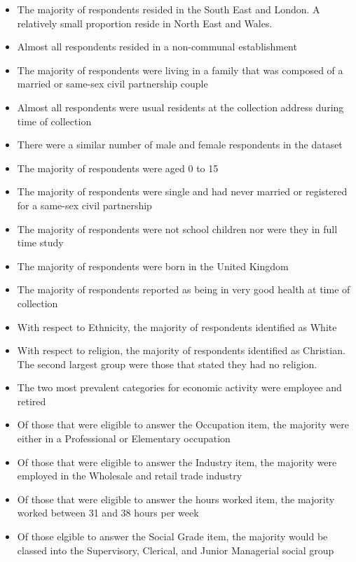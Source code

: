 \documentclass[]{book}
\providecommand{\tightlist}{%
  \setlength{\itemsep}{0pt}\setlength{\parskip}{0pt}}
\begin{document}
\begin{itemize}
\tightlist
\item
  The majority of respondents resided in the South East and London. A
  relatively small proportion reside in North East and Wales.\\
\item
  Almost all respondents resided in a non-communal establishment\\
\item
  The majority of respondents were living in a family that was composed
  of a married or same-sex civil partnership couple\\
\item
  Almost all respondents were usual residents at the collection address
  during time of collection\\
\item
  There were a similar number of male and female respondents in the
  dataset\\
\item
  The majority of respondents were aged 0 to 15\\
\item
  The majority of respondents were single and had never married or
  registered for a same-sex civil partnership
\item
  The majority of respondents were not school children nor were they in
  full time study
\item
  The majority of respondents were born in the United Kingdom\\
\item
  The majority of respondents reported as being in very good health at
  time of collection
\item
  With respect to Ethnicity, the majority of respondents identified as
  White\\
\item
  With respect to religion, the majority of respondents identified as
  Christian. The second largest group were those that stated they had no
  religion.\\
\item
  The two most prevalent categories for economic activity were employee
  and retired\\
\item
  Of those that were eligible to answer the Occupation item, the
  majority were either in a Professional or Elementary occupation
\item
  Of those that were eligible to answer the Industry item, the majority
  were employed in the Wholesale and retail trade industry\\
\item
  Of those that were eligible to answer the hours worked item, the
  majority worked between 31 and 38 hours per week\\
\item
  Of those elgible to answer the Social Grade item, the majority would
  be classed into the Supervisory, Clerical, and Junior Managerial
  social group
\end{itemize}
\end{document}
